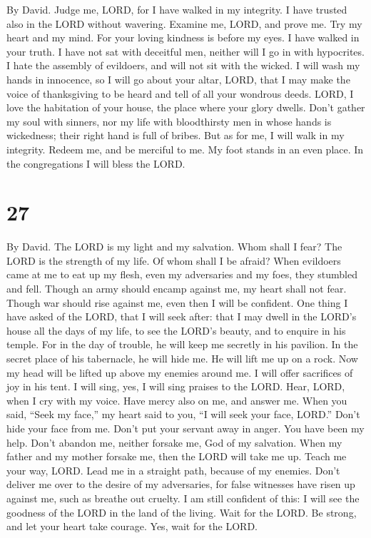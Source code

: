 By David.  Judge me, LORD, for I have walked in my
integrity. I have trusted also in the LORD without wavering.
 Examine me, LORD, and prove me. Try my heart and my mind.
 For your loving kindness is before my eyes. I have walked
in your truth.  I have not sat with deceitful men, neither
will I go in with hypocrites.  I hate the assembly of
evildoers, and will not sit with the wicked.  I will wash my
hands in innocence, so I will go about your altar, LORD, 
that I may make the voice of thanksgiving to be heard and tell of all
your wondrous deeds.  LORD, I love the habitation of your
house, the place where your glory dwells.  Don't gather my
soul with sinners, nor my life with bloodthirsty men  in
whose hands is wickedness; their right hand is full of bribes.
 But as for me, I will walk in my integrity. Redeem me, and
be merciful to me.  My foot stands in an even place. In the
congregations I will bless the LORD.

\hypertarget{section-26}{%
\section{27}\label{section-26}}

By David.  The LORD is my light and my salvation. Whom shall
I fear? The LORD is the strength of my life. Of whom shall I be afraid?
 When evildoers came at me to eat up my flesh, even my
adversaries and my foes, they stumbled and fell.  Though an
army should encamp against me, my heart shall not fear. Though war
should rise against me, even then I will be confident.  One
thing I have asked of the LORD, that I will seek after: that I may dwell
in the LORD's house all the days of my life, to see the LORD's beauty,
and to enquire in his temple.  For in the day of trouble, he
will keep me secretly in his pavilion. In the secret place of his
tabernacle, he will hide me. He will lift me up on a rock. 
Now my head will be lifted up above my enemies around me. I will offer
sacrifices of joy in his tent. I will sing, yes, I will sing praises to
the LORD.  Hear, LORD, when I cry with my voice. Have mercy
also on me, and answer me.  When you said, ``Seek my face,''
my heart said to you, ``I will seek your face, LORD.'' 
Don't hide your face from me. Don't put your servant away in anger. You
have been my help. Don't abandon me, neither forsake me, God of my
salvation.  When my father and my mother forsake me, then
the LORD will take me up.  Teach me your way, LORD. Lead me
in a straight path, because of my enemies.  Don't deliver
me over to the desire of my adversaries, for false witnesses have risen
up against me, such as breathe out cruelty.  I am still
confident of this: I will see the goodness of the LORD in the land of
the living.  Wait for the LORD. Be strong, and let your
heart take courage. Yes, wait for the LORD.

